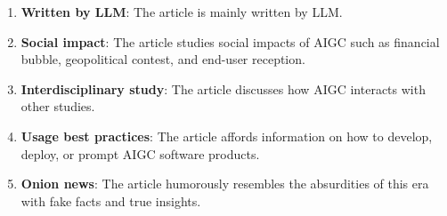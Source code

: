 
\usepackage{pdfpages}


\sffamily



\begin{enumerate}
	\item \textbf{Written by LLM}: The article is mainly written by LLM.
	\item \textbf{Social impact}: The article studies social impacts of AIGC such as financial bubble, geopolitical contest, and end-user reception.
	\item \textbf{Interdisciplinary study}: The article discusses how AIGC interacts with other studies.
	\item \textbf{Usage best practices}: The article affords information on how to develop, deploy, or prompt AIGC software products.
	\item \textbf{Onion news}: The article humorously resembles the absurdities of this era with fake facts and true insights.
\end{enumerate}





